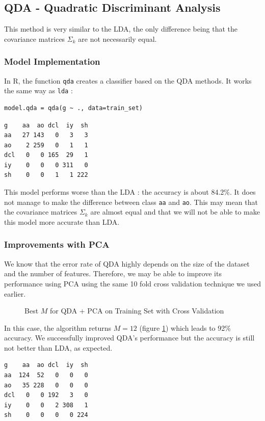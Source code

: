 \documentclass[]{report}
\newcommand{\inputtikz}[2]{%
	\scalebox{#1}{}  
}
\begin{document}
\subsection{QDA - Quadratic Discriminant Analysis}
This method is very similar to the LDA, the only difference being that the covariance matrices $\Sigma_k$ are not necessarily equal.

\subsubsection{Model Implementation}
In R, the function \texttt{qda} creates a classifier based on the QDA methods. It works the same way as \texttt{lda} :
\begin{lstlisting}
model.qda = qda(g ~ ., data=train_set)
\end{lstlisting}

\begin{verbatim}
g    aa  ao dcl  iy  sh
aa   27 143   0   3   3
ao    2 259   0   1   1
dcl   0   0 165  29   1
iy    0   0   0 311   0
sh    0   0   1   1 222
\end{verbatim}

This model performs worse than the LDA : the accuracy is about 84.2\%. It does not manage to make the difference between class \texttt{aa} and \texttt{ao}. This may mean that the covariance matrices $\Sigma_k$ are almost equal and that we will not be able to make this model more accurate than LDA.

\subsubsection{Improvements with PCA}
We know that the error rate of QDA highly depends on the size of the dataset and the number of features. Therefore, we may be able to improve its performance using PCA using the same 10 fold cross validation technique we used earlier.

\begin{figure}[!hb]
	\centering
	\inputtikz{0.5}{Figures/qda_pca_cv.tex}
	\caption{Best $M$ for QDA + PCA on Training Set with Cross Validation}
	\label{fig:qda_pca_cv}
\end{figure}

In this case, the algorithm returns $M = 12$ (figure \ref{fig:qda_pca_cv}) which leads to 92\% accuracy. We successfully improved QDA's performance but the accuracy is still not better than LDA, as expected.

\begin{verbatim}
g    aa  ao dcl  iy  sh
aa  124  52   0   0   0
ao   35 228   0   0   0
dcl   0   0 192   3   0
iy    0   0   2 308   1
sh    0   0   0   0 224
\end{verbatim}
\end{document}
